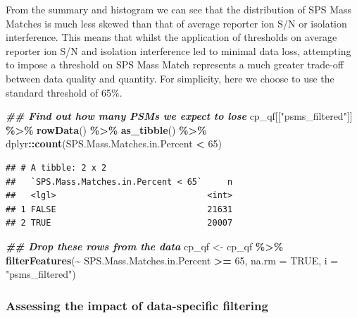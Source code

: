 \documentclass[9pt,a4paper,]{extarticle}
\newenvironment{Shaded}{\begin{snugshade}}{\end{snugshade}}
\newcommand{\AttributeTok}[1]{\textcolor[rgb]{0.13,0.29,0.53}{#1}}
\newcommand{\ConstantTok}[1]{\textcolor[rgb]{0.56,0.35,0.01}{#1}}
\newcommand{\DecValTok}[1]{\textcolor[rgb]{0.00,0.00,0.81}{#1}}
\newcommand{\DocumentationTok}[1]{\textcolor[rgb]{0.56,0.35,0.01}{\textbf{\textit{#1}}}}
\newcommand{\FunctionTok}[1]{\textcolor[rgb]{0.13,0.29,0.53}{\textbf{#1}}}
\newcommand{\NormalTok}[1]{#1}
\newcommand{\OtherTok}[1]{\textcolor[rgb]{0.56,0.35,0.01}{#1}}
\newcommand{\SpecialCharTok}[1]{\textcolor[rgb]{0.81,0.36,0.00}{\textbf{#1}}}
\newcommand{\StringTok}[1]{\textcolor[rgb]{0.31,0.60,0.02}{#1}}
\begin{document}
From the summary and histogram we can see that the distribution of SPS Mass
Matches is much less skewed than that of average reporter ion S/N or isolation
interference. This means that whilst the application of thresholds on average
reporter ion S/N and isolation interference led to minimal data loss, attempting
to impose a threshold on SPS Mass Match represents a much greater trade-off
between data quality and quantity. For simplicity, here we choose to use the
standard threshold of 65\%.

\begin{Shaded}
\begin{Highlighting}[]
\DocumentationTok{\#\# Find out how many PSMs we expect to lose}
\NormalTok{cp\_qf[[}\StringTok{"psms\_filtered"}\NormalTok{]] }\SpecialCharTok{\%\textgreater{}\%} 
  \FunctionTok{rowData}\NormalTok{() }\SpecialCharTok{\%\textgreater{}\%} 
  \FunctionTok{as\_tibble}\NormalTok{() }\SpecialCharTok{\%\textgreater{}\%} 
\NormalTok{  dplyr}\SpecialCharTok{::}\FunctionTok{count}\NormalTok{(SPS.Mass.Matches.in.Percent }\SpecialCharTok{\textless{}} \DecValTok{65}\NormalTok{)}
\end{Highlighting}
\end{Shaded}

\begin{verbatim}
## # A tibble: 2 x 2
##   `SPS.Mass.Matches.in.Percent < 65`     n
##   <lgl>                              <int>
## 1 FALSE                              21631
## 2 TRUE                               20007
\end{verbatim}

\begin{Shaded}
\begin{Highlighting}[]
\DocumentationTok{\#\# Drop these rows from the data}
\NormalTok{cp\_qf }\OtherTok{\textless{}{-}}\NormalTok{ cp\_qf }\SpecialCharTok{\%\textgreater{}\%}
  \FunctionTok{filterFeatures}\NormalTok{(}\SpecialCharTok{\textasciitilde{}}\NormalTok{ SPS.Mass.Matches.in.Percent }\SpecialCharTok{\textgreater{}=} \DecValTok{65}\NormalTok{, }
                 \AttributeTok{na.rm =} \ConstantTok{TRUE}\NormalTok{,}
                 \AttributeTok{i =} \StringTok{"psms\_filtered"}\NormalTok{)}
\end{Highlighting}
\end{Shaded}

\subsubsection{Assessing the impact of data-specific filtering}\label{assessing-the-impact-of-data-specific-filtering}
\end{document}
